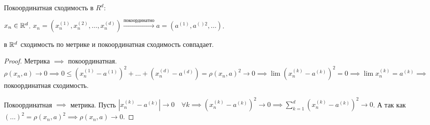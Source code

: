 \begin{definition}
    Покоординатная сходимость в $R^d$:

    $x_n \in \mathbb{R}^d$.  $x_n = (x_n^{(1)}, x_n^{(2)}, \ldots, x_n^{(d)}) \xrightarrow{\text{покоординатно}} a = (a^{(1)}, a^{()2}, \ldots)$.
\end{definition}
\begin{theorem}
    в $\mathbb{R}^d$ сходимость по метрике и покоординатная сходимость совпадает.
\end{theorem}
\begin{proof}
    Метрика $\implies$ покоординатная.  $\rho(x_n, a) \to 0 \implies 0 \le (x_n^{(1)} - a^{(1)})^2 + \ldots + (x_n^{(d)} - a^{(d)}) = \rho(x_n, a)^2 \to 0 \implies \lim (x_n^{(k)} - a^{(k)})^2 = 0 \implies \lim x_n^{(k)} = a^{(k)} \implies$ покоординатная сходимость.

    Покоординатная $\implies$ метрика. Пусть  $|x_n^{(k)} - a^{(k)}| \to 0 \quad \forall k \implies (x_n^{(k)} - a^{(k)})^2 \to 0 \implies \sum\limits_{k=1}^d (x_n^{(k)} - a^{(k)})^2 \to 0$. А так как $(\ldots)^2 = \rho(x_n, a)^2 \implies \rho(x_n, a) \to 0$.
\end{proof}

